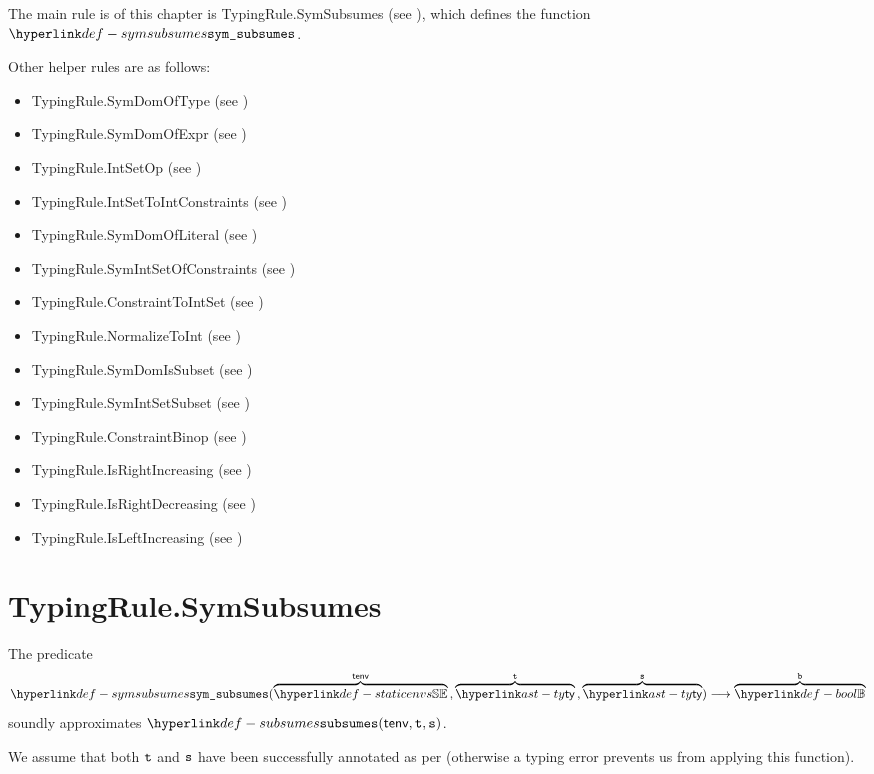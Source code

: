 The main rule is of this chapter is TypingRule.SymSubsumes (see ), which defines the function
$\symsubsumes$.

Other helper rules are as follows:
\begin{itemize}
  \item TypingRule.SymDomOfType (see )
  \item TypingRule.SymDomOfExpr (see )
  \item TypingRule.IntSetOp (see )
  \item TypingRule.IntSetToIntConstraints (see )
  \item TypingRule.SymDomOfLiteral (see )
  \item TypingRule.SymIntSetOfConstraints (see )
  \item TypingRule.ConstraintToIntSet (see )
  \item TypingRule.NormalizeToInt (see )
  \item TypingRule.SymDomIsSubset (see )
  \item TypingRule.SymIntSetSubset (see )
  \item TypingRule.ConstraintBinop (see )
  \item TypingRule.IsRightIncreasing (see )
  \item TypingRule.IsRightDecreasing (see )
  \item TypingRule.IsLeftIncreasing (see )
\end{itemize}

\section{TypingRule.SymSubsumes \label{sec:TypingRule.SymSubsumes}}
\hypertarget{def-symsubsumes}{}
The predicate
\[
  \symsubsumes(\overname{\staticenvs}{\tenv} \aslsep \overname{\ty}{\vt} \aslsep \overname{\ty}{\vs})
  \aslto \overname{\Bool}{\vb}
\]
soundly approximates $\subsumes(\tenv, \vt, \vs)$.
\ProseOtherwiseTypeError

We assume that both $\texttt{t}$ and $\texttt{s}$ have been successfully annotated as per 
(otherwise a typing error prevents us from applying this function).

